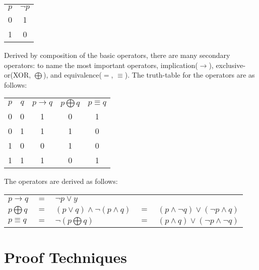 \documentclass{report}
\begin{document}
	\begin{center}
	\begin{tabular}{cc}
		$p$ & $\neg p$\\
		0 & 1\\
		1 & 0
	\end{tabular}
	\end{center}
	
	Derived by composition of the basic operators, there are many secondary operators: to name the most important operators, implication($\rightarrow$), exclusive-or(XOR, $\bigoplus$), and equivalence($=$, $\equiv$). The truth-table for the operators are as follows:
	
	\begin{center}
	\begin{tabular}{ccccc}
		$p$ & $q$ & $p \rightarrow q$ & $p \bigoplus q$ & $p \equiv q$ \\
		0   & 0   & 1                 & 0               & 1     \\
		0   & 1   & 1                 & 1               & 0     \\
		1   & 0   & 0                 & 1               & 0     \\
		1   & 1   & 1                 & 0               & 1    
	\end{tabular}
	\end{center}
	
	The operators are derived as follows:\\
	\begin{center}
	\begin{tabular}{lllll}
		$p \rightarrow q$ & $=$ & $\neg p \vee y$                       &   &                                          \\
		$p \bigoplus q$   & $=$ & $(p \vee q) \wedge \neg (p \wedge q)$ & $=$ & $(p \wedge \neg q) \vee (\neg p \wedge q)$ \\
		$p \equiv q$      & $=$ & $\neg (p \bigoplus q)$                & $=$ & $(p \wedge q) \vee (\neg p \wedge \neg q)$
	\end{tabular}
	\end{center}
	
	\section{Proof Techniques}
\end{document}
